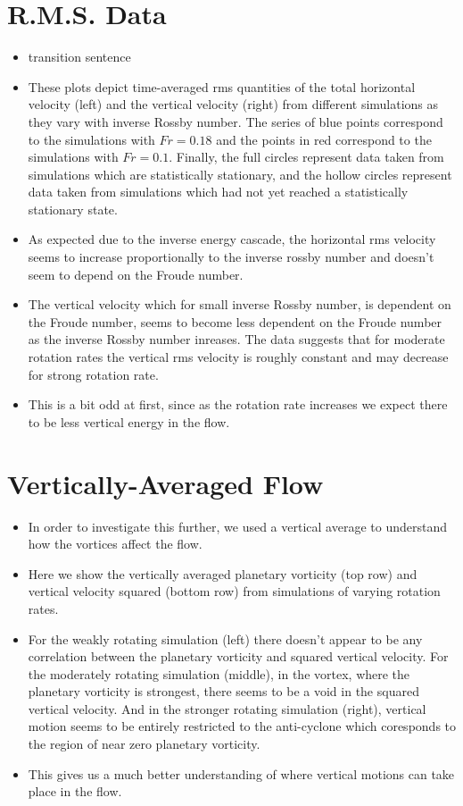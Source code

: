\documentclass{article}
\begin{document}
\section{R.M.S. Data}
\begin{itemize}
    \item transition sentence
    \item These plots depict time-averaged rms quantities of the total
    horizontal velocity (left) and the vertical velocity (right) from different
    simulations as they vary with inverse Rossby number. The series of blue
    points correspond to the simulations with $Fr = 0.18$ and the points in red
    correspond to the simulations with $Fr = 0.1$. Finally, the full circles
    represent data taken from simulations which are statistically stationary,
    and the hollow circles represent data taken from simulations which had not
    yet reached a statistically stationary state. 
    \item As expected due to the inverse energy cascade, the horizontal rms
    velocity seems to increase proportionally to the inverse rossby number and
    doesn't seem to depend on the Froude number.
    \item The vertical velocity which for small inverse Rossby number, is
    dependent on the Froude number, seems to become less dependent on the
    Froude number as the inverse Rossby number inreases. The data suggests that
    for moderate rotation rates the vertical rms velocity is roughly constant
    and may decrease for strong rotation rate. 
    \item This is a bit odd at first, since as the rotation rate increases we
    expect there to be less vertical energy in the flow. 
\end{itemize}

\section{Vertically-Averaged Flow}
\begin{itemize}
    \item In order to investigate this further, we used a vertical average to
    understand how the vortices affect the flow. 
    \item Here we show the vertically averaged planetary vorticity (top row) and
    vertical velocity squared (bottom row) from simulations of varying rotation
    rates. 
    \item For the weakly rotating simulation (left) there doesn't appear to be
    any correlation between the planetary vorticity and squared vertical
    velocity. For the moderately rotating simulation (middle), in the vortex,
    where the planetary vorticity is strongest, there seems to be a void in the
    squared vertical velocity. And in the stronger rotating simulation (right),
    vertical motion seems to be entirely restricted to the anti-cyclone which
    coresponds to the region of near zero planetary vorticity. 
    \item This gives us a much better understanding of where vertical motions
    can take place in the flow. 
\end{itemize}
\end{document}
